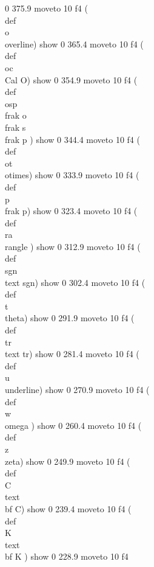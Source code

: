 0 375.9 moveto
10 f4
(\\def \\o {\\overline}) show
0 365.4 moveto
10 f4
(\\def \\oc {{\\Cal O}}) show
0 354.9 moveto
10 f4
(\\def \\osp{\\frak o\\frak s\\frak p} ) show
0 344.4 moveto
10 f4
(\\def \\ot {\\otimes}) show
0 333.9 moveto
10 f4
(\\def \\p {\\frak p}) show
0 323.4 moveto
10 f4
(\\def \\ra {\\rangle} ) show
0 312.9 moveto
10 f4
(\\def \\sgn {{\\text {sgn}}}) show
0 302.4 moveto
10 f4
(\\def \\t {\\theta}) show
0 291.9 moveto
10 f4
(\\def \\tr {{\\text {tr}}}) show
0 281.4 moveto
10 f4
(\\def \\u {\\underline}) show
0 270.9 moveto
10 f4
(\\def \\w {\\omega} ) show
0 260.4 moveto
10 f4
(\\def \\z {\\zeta}) show
0 249.9 moveto
10 f4
(\\def \\C {{\\text {\\bf C}}}) show
0 239.4 moveto
10 f4
(\\def \\K {{\\text {\\bf K}}} ) show
0 228.9 moveto
10 f4
